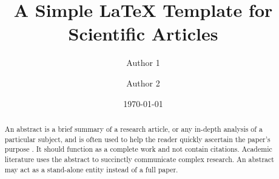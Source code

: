 \documentclass[a4paper,10pt]{article}
\title{A Simple LaTeX Template for Scientific Articles}
\author[1]{Author 1}
\affil[1]{Organization Name}
\author{Author 2}
\date{\today}
\begin{document}
\maketitle

\begin{abstract}
    An abstract is a brief summary of a research article, or any in-depth analysis of a particular subject, and is often used to help the reader quickly ascertain the paper's purpose \cite{techwrite}.
    It should function as a complete work and not contain citations.
    Academic literature uses the abstract to succinctly communicate complex research. An abstract may act as a stand-alone entity instead of a full paper.
\end{abstract}


\end{document}
